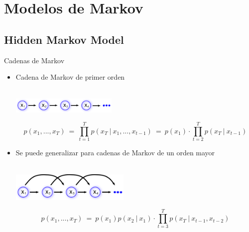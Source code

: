 
\section{Modelos de Markov}
\subsection{Hidden Markov Model}
\begin{frame}{Cadenas de Markov}
    \begin{itemize}
      \itemsep2em
      \item Cadena de Markov de primer orden      
        \\~\\
        \begin{center}
          \includegraphics[width=0.4\textwidth]{gfx/mod-mm1}
        \end{center}        
        \begin{equation}
          \label{eqn:2-4}
          p(x_1, ..., x_T) 
            ~=~ \prod_{t=1}^T p(x_T ~|~ x_1, ..., x_{t-1}) 
            ~=~ p(x_1) \cdot \prod_{t=2}^T p(x_T ~|~ x_{t-1}) 
        \end{equation} 
      \item  Se puede generalizar para cadenas de Markov de un orden mayor
        \\~\\
        \begin{center}
          \includegraphics[width=0.45\textwidth]{gfx/mod-mm2}
        \end{center}
        \begin{equation}
          \label{eqn:2-4}
          p(x_1, ..., x_T) 
            ~=~ p(x_1) p(x_2 ~|~ x_1) \cdot \prod_{t=3}^T p(x_T ~|~ x_{t-1}, x_{t-2}) 
        \end{equation} 
  \end{itemize} 
\end{frame}

